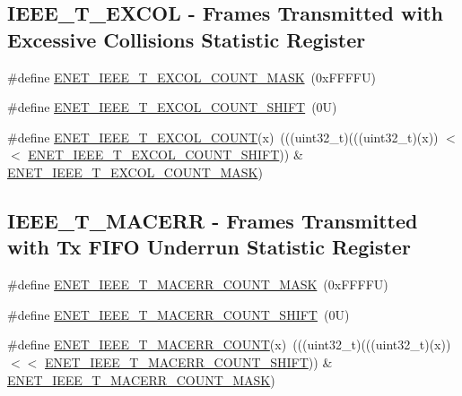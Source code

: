 \subsection*{I\+E\+E\+E\+\_\+\+T\+\_\+\+E\+X\+C\+OL -\/ Frames Transmitted with Excessive Collisions Statistic Register}
\begin{DoxyCompactItemize}
\item 
\#define \mbox{\hyperlink{group___e_n_e_t___register___masks_ga4b5fe7076adb4e19e1271ca3f6f27d16}{E\+N\+E\+T\+\_\+\+I\+E\+E\+E\+\_\+\+T\+\_\+\+E\+X\+C\+O\+L\+\_\+\+C\+O\+U\+N\+T\+\_\+\+M\+A\+SK}}~(0x\+F\+F\+F\+F\+U)
\item 
\#define \mbox{\hyperlink{group___e_n_e_t___register___masks_gab0ed20dee5a8a4ad851053c9bb9359e8}{E\+N\+E\+T\+\_\+\+I\+E\+E\+E\+\_\+\+T\+\_\+\+E\+X\+C\+O\+L\+\_\+\+C\+O\+U\+N\+T\+\_\+\+S\+H\+I\+FT}}~(0\+U)
\item 
\#define \mbox{\hyperlink{group___e_n_e_t___register___masks_gaa05aef85a08b9877b13aa21b4b414443}{E\+N\+E\+T\+\_\+\+I\+E\+E\+E\+\_\+\+T\+\_\+\+E\+X\+C\+O\+L\+\_\+\+C\+O\+U\+NT}}(x)~(((uint32\+\_\+t)(((uint32\+\_\+t)(x)) $<$$<$ \mbox{\hyperlink{group___e_n_e_t___register___masks_gab0ed20dee5a8a4ad851053c9bb9359e8}{E\+N\+E\+T\+\_\+\+I\+E\+E\+E\+\_\+\+T\+\_\+\+E\+X\+C\+O\+L\+\_\+\+C\+O\+U\+N\+T\+\_\+\+S\+H\+I\+FT}})) \& \mbox{\hyperlink{group___e_n_e_t___register___masks_ga4b5fe7076adb4e19e1271ca3f6f27d16}{E\+N\+E\+T\+\_\+\+I\+E\+E\+E\+\_\+\+T\+\_\+\+E\+X\+C\+O\+L\+\_\+\+C\+O\+U\+N\+T\+\_\+\+M\+A\+SK}})
\end{DoxyCompactItemize}
\subsection*{I\+E\+E\+E\+\_\+\+T\+\_\+\+M\+A\+C\+E\+RR -\/ Frames Transmitted with Tx F\+I\+FO Underrun Statistic Register}
\begin{DoxyCompactItemize}
\item 
\#define \mbox{\hyperlink{group___e_n_e_t___register___masks_ga36adf7b60171de45b210bfdec494e6a4}{E\+N\+E\+T\+\_\+\+I\+E\+E\+E\+\_\+\+T\+\_\+\+M\+A\+C\+E\+R\+R\+\_\+\+C\+O\+U\+N\+T\+\_\+\+M\+A\+SK}}~(0x\+F\+F\+F\+F\+U)
\item 
\#define \mbox{\hyperlink{group___e_n_e_t___register___masks_ga29ab60c8c05b2a4081ecdafe9cfa8b40}{E\+N\+E\+T\+\_\+\+I\+E\+E\+E\+\_\+\+T\+\_\+\+M\+A\+C\+E\+R\+R\+\_\+\+C\+O\+U\+N\+T\+\_\+\+S\+H\+I\+FT}}~(0\+U)
\item 
\#define \mbox{\hyperlink{group___e_n_e_t___register___masks_ga712a08e94df6987bb200e27b72044213}{E\+N\+E\+T\+\_\+\+I\+E\+E\+E\+\_\+\+T\+\_\+\+M\+A\+C\+E\+R\+R\+\_\+\+C\+O\+U\+NT}}(x)~(((uint32\+\_\+t)(((uint32\+\_\+t)(x)) $<$$<$ \mbox{\hyperlink{group___e_n_e_t___register___masks_ga29ab60c8c05b2a4081ecdafe9cfa8b40}{E\+N\+E\+T\+\_\+\+I\+E\+E\+E\+\_\+\+T\+\_\+\+M\+A\+C\+E\+R\+R\+\_\+\+C\+O\+U\+N\+T\+\_\+\+S\+H\+I\+FT}})) \& \mbox{\hyperlink{group___e_n_e_t___register___masks_ga36adf7b60171de45b210bfdec494e6a4}{E\+N\+E\+T\+\_\+\+I\+E\+E\+E\+\_\+\+T\+\_\+\+M\+A\+C\+E\+R\+R\+\_\+\+C\+O\+U\+N\+T\+\_\+\+M\+A\+SK}})
\end{DoxyCompactItemize}
